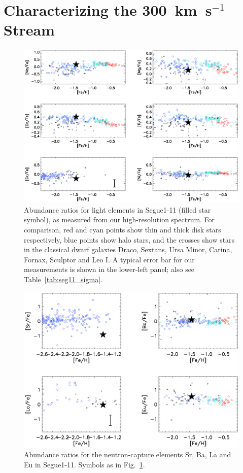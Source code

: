 \documentclass[manuscript]{aastex}
\begin{document}
\section{Characterizing the 300~km~s$^{-1}$ Stream}
\label{sec:char}




\begin{figure}
 \begin{center}
  \includegraphics{light_el.ps}
  \caption{Abundance ratios for light elements in Segue1-11 (filled star symbol), as measured from our high-resolution spectrum. For comparison, red and cyan points show thin and thick disk stars respectively, blue points show halo stars, and the crosses show stars in the classical dwarf galaxies Draco, Sextans, Ursa Minor, Carina, Fornax, Sculptor and Leo I. A typical error bar for our measurements is shown in the lower-left panel; also see Table~\ref{tab:seg11_sigma}. }
  \label{fig:light_el}
 \end{center}
\end{figure} 


\begin{figure}
 \begin{center}
  \includegraphics{nc_el.ps}
  \caption{Abundance ratios for the neutron-capture elements Sr, Ba, La and Eu in Segue1-11. Symbols as in Fig.~\ref{fig:light_el}.}
  \label{fig:nc_el}
 \end{center}
\end{figure} 
\end{document}
